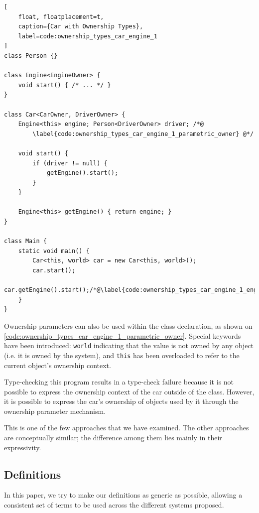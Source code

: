 \documentclass{acm_proc_article-sp}
\begin{document}
\begin{lstlisting}[
	float, floatplacement=t,
	caption={Car with Ownership Types},
	label=code:ownership_types_car_engine_1
]
class Person {}

class Engine<EngineOwner> {
	void start() { /* ... */ }
}

class Car<CarOwner, DriverOwner> {
	Engine<this> engine; Person<DriverOwner> driver; /*@
		\label{code:ownership_types_car_engine_1_parametric_owner} @*/

	void start() {
		if (driver != null) {
			getEngine().start();
		}
	}

	Engine<this> getEngine() { return engine; }
}

class Main {
	static void main() {
		Car<this, world> car = new Car<this, world>();
		car.start();
		car.getEngine().start();/*@\label{code:ownership_types_car_engine_1_engine_start}@*/
	}
}
\end{lstlisting}

Ownership parameters can also be used within the class declaration, as shown on
\cref{code:ownership_types_car_engine_1_parametric_owner}. Special keywords
have been introduced: \lstinline|world| indicating that the value is not owned
by any object (i.e. it is owned by the system), and \lstinline|this| has been
overloaded to refer to the current object's ownership context.

Type-checking this program results in a type-check failure because it is not
possible to express the ownership context of the car outside of the class.
However, it is possible to express the car's ownership of objects used by it
through the ownership parameter mechanism.

This is one of the few approaches that we have examined. The other approaches
are conceptually similar; the difference among them lies mainly in their
expressivity.

\subsection{Definitions}
\label{subsec:definitions}

In this paper, we try to make our definitions as generic as possible, allowing
a consistent set of terms to be used across the different systems proposed.
\end{document}
